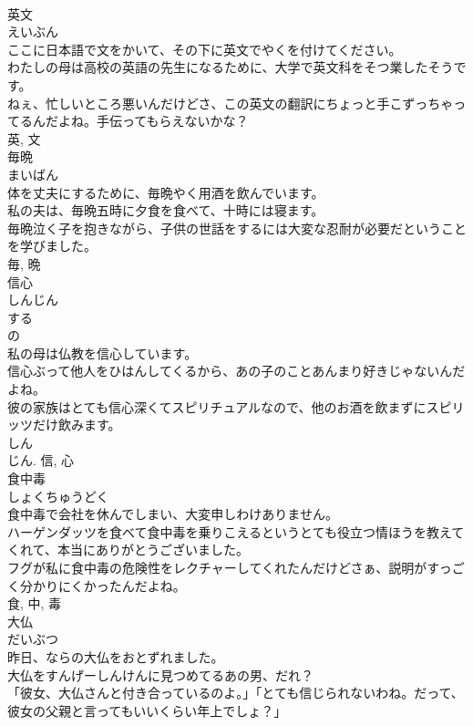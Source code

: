 \documentclass[8pt]{extreport}
\begin{document}
\begin{CJK}{UTF8}{min}
\\	英文	
\\	えいぶん	
\\	ここに日本語で文をかいて、その下に英文でやくを付けてください。	
\\	わたしの母は高校の英語の先生になるために、大学で英文科をそつ業したそうです。	
\\	ねぇ、忙しいところ悪いんだけどさ、この英文の翻訳にちょっと手こずっちゃってるんだよね。手伝ってもらえないかな？	
\\	英, 文	
\\	毎晩	
\\	まいばん	
\\	体を丈夫にするために、毎晩やく用酒を飲んでいます。	
\\	私の夫は、毎晩五時に夕食を食べて、十時には寝ます。	
\\	毎晩泣く子を抱きながら、子供の世話をするには大変な忍耐が必要だということを学びました。	
\\	毎, 晩	
\\	信心	
\\	しんじん	
\\	する 
\\	の 
\\	私の母は仏教を信心しています。	
\\	信心ぶって他人をひはんしてくるから、あの子のことあんまり好きじゃないんだよね。	
\\	彼の家族はとても信心深くてスピリチュアルなので、他のお酒を飲まずにスピリッツだけ飲みます。	
\\	しん 
\\	じん.	信, 心	
\\	食中毒	
\\	しょくちゅうどく	
\\	食中毒で会社を休んでしまい、大変申しわけありません。	
\\	ハーゲンダッツを食べて食中毒を乗りこえるというとても役立つ情ほうを教えてくれて、本当にありがとうございました。	
\\	フグが私に食中毒の危険性をレクチャーしてくれたんだけどさぁ、説明がすっごく分かりにくかったんだよね。	
\\	食, 中, 毒	
\\	大仏	
\\	だいぶつ	
\\	昨日、ならの大仏をおとずれました。	
\\	大仏をすんげーしんけんに見つめてるあの男、だれ？	
\\	「彼女、大仏さんと付き合っているのよ。」「とても信じられないわね。だって、彼女の父親と言ってもいいくらい年上でしょ？」	

\end{CJK}
\end{document}
